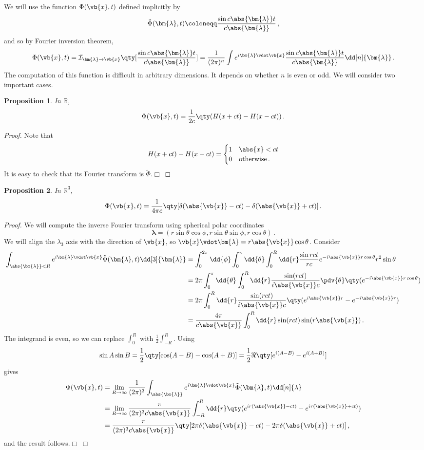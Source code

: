 \documentclass{article}
\theoremstyle{plain}\theoremheaderfont{\normalfont\itshape}\theorembodyfont{\rmfamily}\theoremseparator{.}\newtheorem*{rem}{Remark}\newtheorem*{ex}{Example}\newtheorem*{proof}{Proof}\newtheorem*{altp}{Alternative proof}
\theoremstyle{plain}\theoremheaderfont{\normalfont\bfseries}\theorembodyfont{\rmfamily}\theoremseparator{.}\newtheorem{thm}{Theorem}[section]\newtheorem{lem}[thm]{Lemma}\newtheorem{prop}[thm]{Proposition}\newtheorem*{cor}{Corollary}\newtheorem{defn}[thm]{Definition}\newtheorem{clm}[thm]{Claim}\newtheorem{clminproof}{Claim}
\theoremstyle{break}\theoremheaderfont{\normalfont\itshape}\theorembodyfont{\rmfamily}\theoremseparator{.\medskip}\newtheorem*{proofskip}{Proof}\newtheorem*{exs}{Examples}\newtheorem*{rems}{Remarks}
\theoremstyle{break}\theoremheaderfont{\normalfont\bfseries}\theorembodyfont{\rmfamily}\theoremseparator{.\medskip}\newtheorem{lemskip}[thm]{Lemma}\newtheorem{defnskip}[thm]{Definition}\newtheorem{propskip}[thm]{Proposition}\newtheorem{thmskip}[thm]{Theorem}
\numberwithin{equation}{section}
\newcommand{\qed}{\hfill\ensuremath{\Box}}
\newcommand{\bl}{\bm{\lambda}}
\begin{document}
	We will use the function \(\Phi(\vb{x},t)\) defined implicitly by
	\[\tilde{\Phi}(\bl,t)\coloneqq\frac{\sin c\abs{\bl}t}{c\abs{\bl}}\,,\]
	and so by Fourier inversion theorem,
	\[\Phi(\vb{x},t)=\mathcal{I}_{\bl\to\vb{x}}\qty[\frac{\sin c\abs{\bl}t}{c\abs{\bl}}]=\frac{1}{(2\pi)^n}\int e^{i\bl\vdot\vb{x}}\frac{\sin c\abs{\bl}t}{c\abs{\bl}}\dd[n]{\bl}\,.\]
	The computation of this function is difficult in arbitrary dimensions. It depends on whether \(n\) is even or odd. We will consider two important cases.
	\begin{prop}
		In \(\mathbb{R}\),
		\[\Phi(\vb{x},t)=\frac{1}{2c}\qty(H(x+ct)-H(x-ct))\,.\]
	\end{prop}
	\begin{proof}
		Note that
		\[H(x+ct)-H(x-ct)=\begin{cases}
			1 & \abs{x}<ct\\
			0 & \text{otherwise}\,.
		\end{cases}\]
		It is easy to check that its Fourier transform is \(\tilde{\Phi}\).\qed
	\end{proof}
	\begin{prop}
		In \(\mathbb{R}^3\),
		\[\Phi(\vb{x},t)=\frac{1}{4\pi c}\qty[\delta(\abs{\vb{x}}-ct)-\delta(\abs{\vb{x}}+ct)]\,.\]
	\end{prop}
	\begin{proof}
		We will compute the inverse Fourier transform using spherical polar coordinates
		\[\bl=(r\sin\theta\cos\phi,r\sin\theta\sin\phi,r\cos\theta)\,.\]
		We will align the \(\lambda_3\) axis with the direction of \(\vb{x}\), so \(\vb{x}\vdot\bl=r\abs{\vb{x}}\cos\theta\). Consider
		\begin{align*}
			\int_{\abs{\bl}<R}e^{i\bl\vdot\vb{x}}\tilde{\Phi}(\bl,t)\dd[3]{\bl}&=\int_{0}^{2\pi}\dd{\phi}\int_{0}^{\pi}\dd{\theta}\int_{0}^{R}\dd{r}\frac{\sin{rct}}{rc}e^{-i\abs{\vb{x}}r\cos\theta}r^2\sin\theta\\
			&=2\pi\int_{0}^{\pi}\dd{\theta}\int_{0}^{R}\dd{r}\frac{\sin(rct)}{i\abs{\vb{x}}c}\pdv{\theta}\qty(e^{-i\abs{\vb{x}}r\cos\theta})\\
			&=2\pi\int_{0}^{R}\dd{r}\frac{\sin(rct)}{i\abs{\vb{x}}c}\qty(e^{i\abs{\vb{x}}r}-e^{-i\abs{\vb{x}}r})\\
			&=\frac{4\pi}{c\abs{\vb{x}}}\int_{0}^{R}\dd{r}\sin(rct)\sin(r\abs{\vb{x}})\,.
		\end{align*}
		The integrand is even, so we can replace \(\int_{0}^{R}\) with \(\frac{1}{2}\int_{-R}^{R}\). Using
		\[\sin A\sin B=\frac{1}{2}\qty[\cos(A-B)-\cos(A+B)]=\frac{1}{2}\Re\qty[e^{i(A-B)}-e^{i(A+B)}]\]
		gives
		\begin{align*}
			\Phi(\vb{x},t)&=\lim_{R\to\infty}\frac{1}{(2\pi)^3}\int_{\abs{\bl}}e^{i\bl\vdot\vb{x}}\tilde{\Phi}(\bl,t)\dd[n]{\lambda}\\
			&=\lim_{R\to\infty}\frac{\pi}{(2\pi)^3c\abs{\vb{x}}}\int_{-R}^{R}\dd{r}\qty(e^{ir(\abs{\vb{x}}-ct)}-e^{ir(\abs{\vb{x}}+ct)})\\
			&=\frac{\pi}{(2\pi)^3c\abs{\vb{x}}}\qty[2\pi\delta(\abs{\vb{x}}-ct)-2\pi\delta(\abs{\vb{x}}+ct)]\,,
		\end{align*}
		and the result follows.\qed
	\end{proof}
\end{document}
